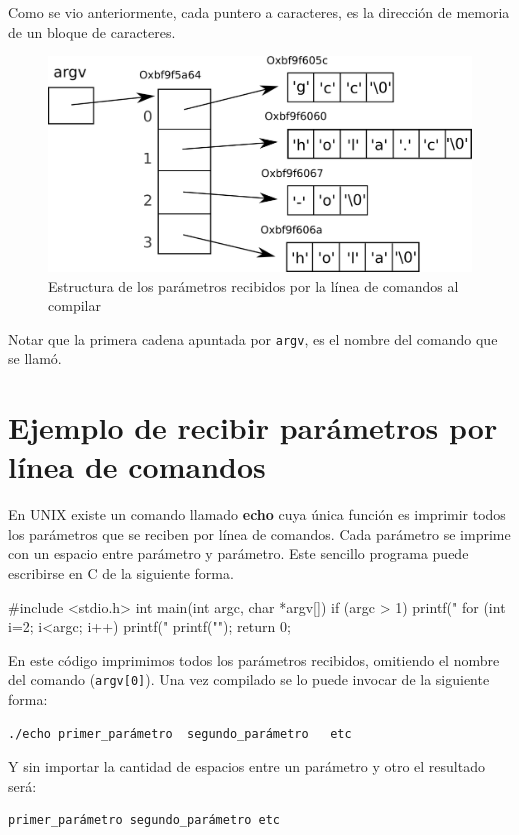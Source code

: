 Como se vio anteriormente, cada puntero a caracteres, es la dirección de
memoria de un bloque de caracteres.

\begin{figure}[htb]
\centering
\includegraphics{imagenes/parametros}
\caption{Estructura de los parámetros recibidos por la línea de comandos
al compilar}
\end{figure}

Notar que la primera cadena apuntada por \lstinline!argv!, es el nombre del
comando que se llamó.

\section{Ejemplo de recibir parámetros por línea de comandos}

En UNIX existe un comando llamado \textbf{echo} cuya única función es imprimir
todos los parámetros que se reciben por línea de comandos. Cada parámetro se
imprime con un espacio entre parámetro y parámetro. Este sencillo programa
puede escribirse en C de la siguiente forma.

\begin{codigo-c}
#include <stdio.h>
int main(int argc, char *argv[])
{
    if (argc > 1) {
        printf("%
    }
    for (int i=2; i<argc; i++) {
        printf(" %
    }
    printf("\n");
    return 0;
}
\end{codigo-c}

En este código imprimimos todos los parámetros recibidos, omitiendo el
nombre del comando (\lstinline!argv[0]!).
Una vez compilado se lo puede invocar de la siguiente forma:

\begin{verbatim}
./echo primer_parámetro  segundo_parámetro   etc
\end{verbatim}

Y sin importar la cantidad de espacios entre un parámetro y otro el resultado
será:

\begin{verbatim}
primer_parámetro segundo_parámetro etc
\end{verbatim}

